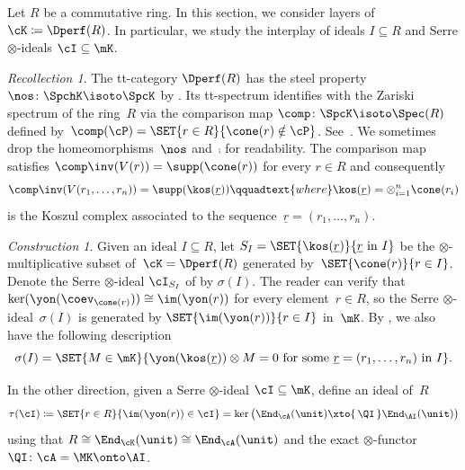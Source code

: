 \documentclass[11pt]{amsart}
\numberwithin{equation}{section} %
\theoremstyle{plain}
\theoremstyle{definition}
\theoremstyle{remark}
\newtheorem{cons}[equation]{Construction}
\newtheorem{rec}[equation]{Recollection}
\begin{document}
Let $R$ be a commutative ring. In this section, we consider layers of $\cK \coloneq \Dperf(R)$. In particular, we study the interplay of ideals $I \subseteq R$ and Serre $\otimes$-ideals $\cI \subseteq \mK$.

\begin{rec}
The tt-category $\Dperf(R)$ has the steel property~$\nos\colon \SpchK\isoto \SpcK$ by \cite[Corollary 5.11]{Balmer20a}. Its tt-spectrum identifies with the Zariski spectrum of the ring~$R$ via the comparison map $\comp\colon\SpcK \isoto \Spec(R)$ defined by~$\comp(\cP)=\SET{r\in R}{\cone(r)\notin\cP}$. See~\cite{Balmer10b}.
We sometimes drop the homeomorphisms~$\nos$ and~$\comp$ for readability.
The comparison map satisfies $\comp\inv(V(r))=\supp(\cone(r))$ for every $r\in R$ and consequently
%
\begin{equation}
\label{eq:supp-kos}%
\comp\inv(V(r_1,\ldots,r_n))=\supp(\kos(\underline{r}))
\qquadtext{where}
\kos(\underline{r}) = \otimes_{i=1}^n \cone(r_i)
\end{equation}
%
is the Koszul complex associated to the sequence~$\underline{r}=(r_1,\ldots,r_n)$.
\end{rec}

\begin{cons}
\label{cons:ideal-Serre-ideal-corr}
Given an ideal $I \subseteq R$, let $S_I = \SET{\kos(\underline{r})}{\underline{r}\textrm{ in }I}$ be the $\otimes$-multiplicative subset of~$\cK=\Dperf(R)$ generated by~$\SET{\cone(r)}{r\in I}$. Denote the Serre $\otimes$-ideal $\cI_{S_I}$ of  by $\sigma(I)$. The reader can verify that $\ker(\yon(\coev_{\cone(r)})) \cong \im(\yon(r))$ for every element~$r \in R$, so the Serre $\otimes$-ideal~$\sigma(I)$ is generated by $\SET{\im(\yon(r))}{r \in I}$ in~$\mK$. By , we also have the following description
%
\[\sigma(I) = \SET{M \in \mK}{\yon(\kos(\underline{r})) \otimes M = 0 \textrm{ for some } \underline{r}=(r_1, \ldots, r_n)\textrm{ in }I}.\]
%

In the other direction, given a Serre $\otimes$-ideal $\cI \subseteq \mK$, define an ideal of~$R$
%
\[
\tau(\cI) \coloneq \SET{r\in R}{\im(\yon(r))\in\cI}=\ker\big(\End_\cA(\unit)\xto{\,\QI\,} \End_{\AI}(\unit)\big)
\]
%
using that $R\cong\End_{\cK}(\unit)\cong\End_{\cA}(\unit)$ and the exact $\otimes$-functor~$\QI\colon \cA=\MK\onto \AI$.
\end{cons}
\end{document}
